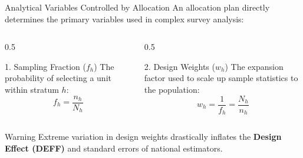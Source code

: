 \documentclass[10pt, aspectratio=169]{beamer}
\begin{document}
  \begin{frame}{Analytical Variables Controlled by Allocation}
      An allocation plan directly determines the primary variables used in complex survey analysis:
      
      \vspace{0.4cm}
      \begin{columns}
          \begin{column}{0.5\textwidth}
              \begin{block}{1. Sampling Fraction ($f_h$)}
                  The probability of selecting a unit within stratum $h$:
                  $$f_h = \frac{n_h}{N_h}$$
              \end{block}
          \end{column}
          \begin{column}{0.5\textwidth}
              \begin{block}{2. Design Weights ($w_h$)}
                  The expansion factor used to scale up sample statistics to the population:
                  $$w_h = \frac{1}{f_h} = \frac{N_h}{n_h}$$
              \end{block}
          \end{column}
      \end{columns}
      \vspace{0.4cm}
      \begin{alertblock}{Warning}
          Extreme variation in design weights drastically inflates the \textbf{Design Effect (DEFF)} and standard errors of national estimators.
      \end{alertblock}
  \end{frame}
  
\end{document}
